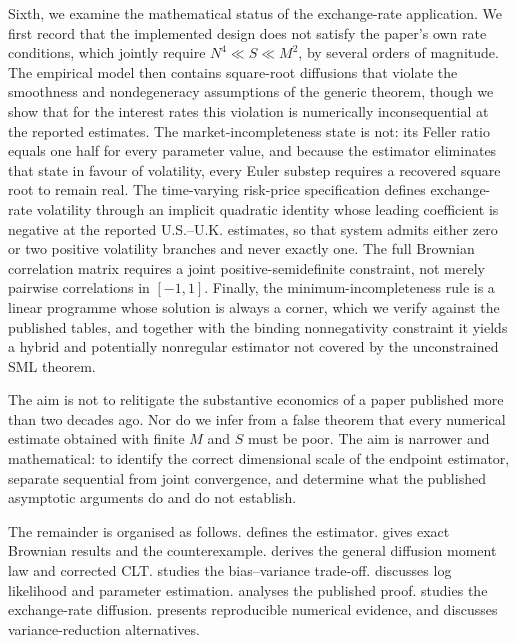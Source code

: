 \documentclass[11pt]{article}
\theoremstyle{definition}
\begin{document}
Sixth, we examine the mathematical status of the exchange-rate application. We first record that the implemented design does not satisfy the paper's own rate conditions, which jointly require $N^4\ll S\ll M^2$, by several orders of magnitude. The empirical model then contains square-root diffusions that violate the smoothness and nondegeneracy assumptions of the generic theorem, though we show that for the interest rates this violation is numerically inconsequential at the reported estimates. The market-incompleteness state is not: its Feller ratio equals one half for every parameter value, and because the estimator eliminates that state in favour of volatility, every Euler substep requires a recovered square root to remain real. The time-varying risk-price specification defines exchange-rate volatility through an implicit quadratic identity whose leading coefficient is negative at the reported U.S.--U.K. estimates, so that system admits either zero or two positive volatility branches and never exactly one. The full Brownian correlation matrix requires a joint positive-semidefinite constraint, not merely pairwise correlations in $[-1,1]$. Finally, the minimum-incompleteness rule is a linear programme whose solution is always a corner, which we verify against the published tables, and together with the binding nonnegativity constraint it yields a hybrid and potentially nonregular estimator not covered by the unconstrained SML theorem.

The aim is not to relitigate the substantive economics of a paper published more than two decades ago. Nor do we infer from a false theorem that every numerical estimate obtained with finite $M$ and $S$ must be poor. The aim is narrower and mathematical: to identify the correct dimensional scale of the endpoint estimator, separate sequential from joint convergence, and determine what the published asymptotic arguments do and do not establish.

The remainder is organised as follows.  defines the estimator.  gives exact Brownian results and the counterexample.  derives the general diffusion moment law and corrected CLT.  studies the bias--variance trade-off.  discusses log likelihood and parameter estimation.  analyses the published proof.  studies the exchange-rate diffusion.  presents reproducible numerical evidence, and  discusses variance-reduction alternatives.
\end{document}
